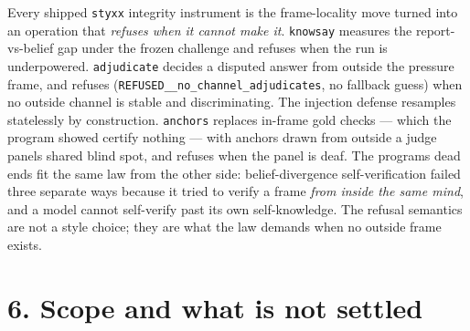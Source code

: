 \documentclass[11pt]{article}
\begin{document}
Every shipped \texttt{styxx} integrity instrument is the frame-locality move turned into an operation that \emph{refuses when it cannot make it}. \texttt{knowsay} measures the report-vs-belief gap under the frozen challenge and refuses when the run is underpowered. \texttt{adjudicate} decides a disputed answer from outside the pressure frame, and refuses (\texttt{REFUSED\_\_no\_channel\_adjudicates}, no fallback guess) when no outside channel is stable and discriminating. The injection defense resamples statelessly by construction. \texttt{anchors} replaces in-frame gold checks --- which the program showed certify nothing --- with anchors drawn from outside a judge panel\textquotesingle s shared blind spot, and refuses when the panel is deaf. The program\textquotesingle s dead ends fit the same law from the other side: belief-divergence self-verification failed three separate ways because it tried to verify a frame \emph{from inside the same mind}, and a model cannot self-verify past its own self-knowledge. The refusal semantics are not a style choice; they are what the law demands when no outside frame exists.

\section{6. Scope and what is not settled}\label{6-scope-and-what-is-not-settled}
\end{document}
